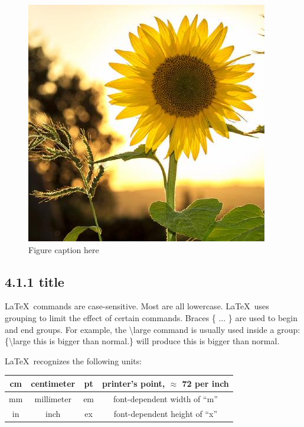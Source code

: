 \documentclass[12pt,openright]{book}
\begin{document}
\begin{figure}[!htbp]
  \centering
  \includegraphics[width=\textwidth]{29571453}
  \caption{Figure caption here}
  \label{fig:29571453.jpg}
\end{figure}

\subsection{4.1.1 title}

\LaTeX\ commands are case-sensitive. Most are all lowercase. \LaTeX\ uses grouping to limit the effect of certain commands. Braces \{ ... \} are used to begin and end groups. For example, the
\textbackslash large command is usually used inside a group: \{\textbackslash large this is bigger than normal.\}  will produce {\large this is bigger than normal.} 

\LaTeX\ recognizes the following units:
\vskip 0.2in
\begin{tabular}{|c|c||c|c|}
  \hline 
  cm & centimeter & pt & printer’s point, $\approx$ 72 per inch \\ \hline
  mm & millimeter & em & font-dependent width of “m” \\ 	\hline
  in & inch & ex & font-dependent height of “x” \\ 	\hline
\end{tabular}
\vskip 0.2in
\end{document}
